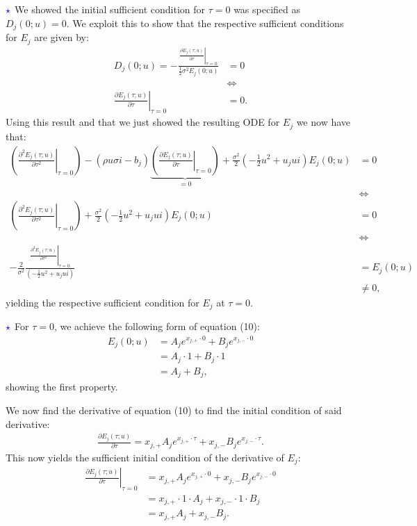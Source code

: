 \documentclass[11pt]{article}
\numberwithin{equation}{section}
\begin{document}
$\textcolor{blue}{\star}$  We showed the initial sufficient condition for $\tau=0$ was
specified as
$D_j(0;u)=0$. We exploit this to show that the respective sufficient conditions for $E_j$ are
given by:
\begin{align*}
    D_j(0;u)=-\frac{\left. \frac{\partial E_j(\tau;u)}{\partial \tau}\right|_{\tau=0}}{\frac{1}{2}\sigma^2E_j(0;u)}&=0\\
    &\iff\\
    \left. \frac{\partial E_j(\tau;u)}{\partial \tau}\right|_{\tau=0}&=0.
\end{align*}
Using this result and that we just showed the resulting ODE for $E_j$ we now have that:
\begin{align*}
    \left ( \left. \frac{\partial^2 E_j(\tau;u)}{\partial \tau^2}\right|_{\tau=0} \right )-(\rho u \sigma i-b_j)\underbrace{\left (\left. \frac{\partial E_j(\tau;u)}{\partial \tau}\right|_{\tau=0} \right )}_{= 0} + \frac{\sigma^2}{2} \left( -\frac{1}{2}u^2 + u_j ui \right) E_j(0;u)&= 0\\
    &\iff\\
    \left ( \left. \frac{\partial^2 E_j(\tau;u)}{\partial \tau^2}\right|_{\tau=0} \right ) + \frac{\sigma^2}{2} \left( -\frac{1}{2}u^2 + u_j ui \right) E_j(0;u) &= 0\\
    &\iff\\
    -\frac{2}{\sigma^2}\frac{\left.\frac{\partial^2 E_j(\tau;u)}{\partial \tau^2}\right|_{\tau=0}}{\left( -\frac{1}{2}u^2 + u_j ui \right)}&=E_j(0;u)\\
    &\neq 0,
\end{align*}
yielding the respective sufficient condition for $E_j$ at $\tau=0$.

$\textcolor{blue}{\star}$ For $\tau=0$, we achieve the following form of
equation (10):
\begin{align*}
    E_j(0;u)&=A_je^{x_{j,+}\cdot 0}+B_je^{x_{j,-}\cdot 0}\\&
    =A_j\cdot 1+B_j \cdot 1\\
    &=A_j + B_j,
\end{align*}
showing the first property.

We now find the derivative of equation (10) to find the initial condition of
said derivative:
\begin{align*}
    \frac{\partial E_j(\tau;u)}{\partial \tau}=x_{j,+}A_je^{x_{j,+}\cdot\tau}+x_{j,-}B_je^{x_{j,-}\cdot\tau}.
\end{align*}
This now yields the sufficient initial condition of the derivative of $E_j$:
\begin{align*}
    \left. \frac{\partial E_j(\tau;u)}{\partial \tau} \right|_{\tau=0}&=x_{j,+}A_je^{x_{j,+}\cdot 0}+x_{j,-}B_j e^{x_{j,-}\cdot 0}\\
    &=x_{j,+} \cdot 1 \cdot A_j+x_{j,-} \cdot 1 \cdot B_j \\
    &=x_{j,+} A_j+x_{j,-} B_j.
\end{align*}
\end{document}
